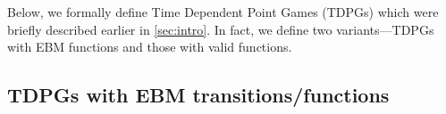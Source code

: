 \documentclass{theoretics}
\begin{document}
%

%

%
%
%
%
%
%
%
%
%
%
%
%
%
%

%

%
%
%
%
%
%
%






%
Below, we formally define Time Dependent Point Games (TDPGs) which were briefly described earlier in \cref{sec:intro}. In fact, we define two variants---TDPGs with EBM functions and those with valid functions. %
%

\subsection{TDPGs with EBM transitions/functions\label{subsec:tdpgebm}}
\end{document}
